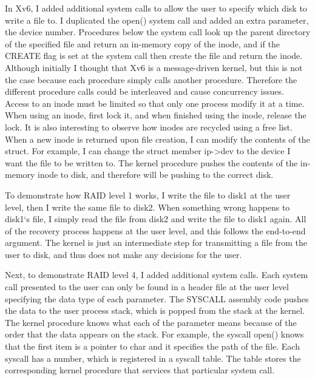 In Xv6, I added additional system calls to allow the user to specify which disk to write a file to. I duplicated the open() system call and added an extra parameter, the device number. Procedures below the system call look up the parent directory of the specified file and return an in-memory copy of the inode, and if the CREATE flag is set at the system call then create the file and return the inode. Although initially I thought that Xv6 is a message-driven kernel, but this is not the case because each procedure simply calls another procedure. Therefore the different procedure calls could be interleaved and cause concurrency issues. Access to an inode must be limited so that only one process modify it at a time. When using an inode, first lock it, and when finished using the inode, release the lock. It is also interesting to observe how inodes are recycled using a free list. When a new inode is returned upon file creation, I can modify the contents of the struct. For example, I can change the struct member ip->dev to the device I want the file to be written to. The kernel procedure pushes the contents of the in-memory inode to disk, and therefore will be pushing to the correct disk.

To demonstrate how RAID level 1 works, I write the file to disk1 at the user level, then I write the same file to disk2. When something wrong happens to disk1`s file, I simply read the file from disk2 and write the file to disk1 again. All of the recovery process happens at the user level, and this follows the end-to-end argument. The kernel is just an intermediate step for transmitting a file from the user to disk, and thus does not make any decisions for the user. 

Next, to demonstrate RAID level 4, I added additional system calls. Each system call presented to the user can only be found in a header file at the user level specifying the data type of each parameter. The SYSCALL assembly code pushes the data to the user process stack, which is popped from the stack at the kernel. The kernel procedure knows what each of the parameter means because of the order that the data appears on the stack. For example, the syscall open() knows that the first item is a pointer to char and it specifies the path of the file. Each syscall has a number, which is registered in a syscall table. The table stores the corresponding kernel procedure that services that particular system call.


